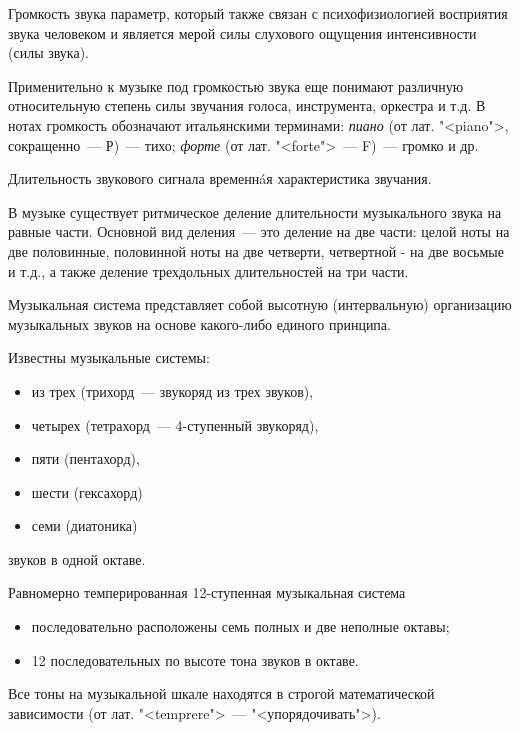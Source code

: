 \documentclass{beamer}
\begin{document}
\begin{frame}
  \begin{block}{Громкость звука} 
  параметр, который также связан с психофизиологией восприятия звука человеком и является мерой силы слухового ощущения интенсивности (силы звука). 
  \end{block}  
  Применительно к музыке под громкостью звука еще понимают различную относительную степень силы звучания голоса, инструмента, оркестра и т.д. В нотах громкость обозначают итальянскими терминами: {\itshape пиано} (от лат. "<piano">, сокращенно~--- Р)~--- тихо; {\itshape форте} (от лат. "<forte">~--- F)~--- громко и др.
  \begin{block}{Длительность звукового сигнала}
  временн{\'a}я характеристика звучания.  
  \end{block}
  В музыке существует ритмическое деление длительности музыкального звука на равные части. Основной вид деления~--- это деление на две части: целой ноты на две половинные, половинной ноты на две четверти, четвертной - на две восьмые и т.д., а также деление трехдольных длительностей на три части.  
\end{frame}

\begin{frame}
  \begin{block}{Музыкальная система}
  представляет собой высотную (интервальную) организацию музыкальных звуков на основе какого-либо единого принципа.   
  \end{block}

Известны музыкальные системы:
\begin{itemize}
\item из трех (трихорд~--- звукоряд из трех звуков), 
\item четырех (тетрахорд~--- 4-ступенный звукоряд), 
\item пяти (пентахорд), 
\item шести (гексахорд) 
\item семи (диатоника) 
\end{itemize} 
звуков в одной октаве.

\begin{block}{Равномерно темперированная 12-ступенная музыкальная система}
  \begin{itemize}
    \item последовательно расположены семь полных и две неполные октавы;
    \item 12 последовательных по высоте тона звуков в октаве.
  \end{itemize}
\end{block}

Все тоны на музыкальной шкале находятся в строгой математической зависимости (от лат. "<temprere">~--- "<упорядочивать">).
\end{frame}
\end{document}
